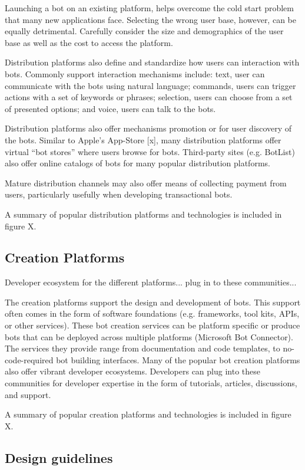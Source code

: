 \documentclass{sig-alternate}
\begin{document}
	Launching a bot on an existing platform, helps overcome the cold start problem that many new applications face. Selecting the wrong user base, however, can be equally detrimental. Carefully consider the size and demographics of the user base as well as the cost to access the platform. 

	Distribution platforms also define and standardize how users can interaction with bots.  Commonly support interaction mechanisms include: text, user can communicate with the bots using natural language; commands, users can trigger actions with a set of keywords or phrases; selection, users can choose from a set of presented options; and voice, users can talk to the bots.

	Distribution platforms also offer mechanisms promotion or for user discovery of the bots. Similar to Apple's App-Store [x], many distribution platforms offer virtual ``bot stores'' where users browse for bots. Third-party sites (e.g. BotList) also offer online catalogs of bots for many popular distribution platforms. 

	Mature distribution channels may also offer means of collecting payment from users, particularly usefully when developing transactional bots.

	A summary of popular distribution platforms and technologies is included in figure X.

	\subsection{Creation Platforms}
	Developer ecosystem for the different platforms...  plug in to these communities...

	The creation platforms support the design and development of bots. This support often comes in the form of software foundations (e.g. frameworks, tool kits, APIs, or other services). These bot creation services can be platform specific or produce bots that can be deployed across multiple platforms (Microsoft Bot Connector). The services they provide range from documentation and code templates, to no-code-required bot building interfaces. 
	Many of the popular bot creation platforms also offer vibrant developer ecosystems. Developers can plug into these communities for developer expertise in the form of tutorials, articles, discussions, and support.

	A summary of popular creation platforms and technologies is included in figure X.

	\subsection{Design guidelines}
\end{document}
